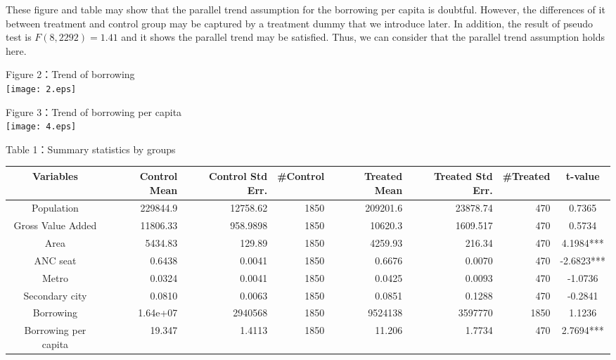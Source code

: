 \documentclass[dvipdfmx]{jsarticle}
\begin{document}
\quad These figure and table may show that the parallel trend assumption for the borrowing per capita is doubtful. However, the differences of it between treatment and control group may be captured by a treatment dummy that we introduce later. In addition, the result of pseudo test is $F(8,2292) =1.41$ and it shows the parallel trend may be satisfied. Thus, we can consider that the parallel trend assumption holds here. 
\begin{center}Figure 2：Trend of borrowing\\
\texttt{[image: 2.eps]}
\end{center}
\begin{center}Figure 3：Trend of borrowing per capita\\
\texttt{[image: 4.eps]}
\end{center}
\begin{center}Table 1：Summary statistics by groups\\
\scriptsize\begin{tabular}{c|rrrrrr|c} \hline
Variables &Control Mean&Control Std Err.  & \#Control &Treated Mean &Treated Std Err. &\#Treated &t-value \\ \hline
Population & 229844.9 &12758.62&  1850 & 209201.6  &23878.74 & 470 &0.7365\\ 
Gross Value Added  &11806.33&958.9898 &1850&10620.3  & 1609.517 &470 &  0.5734\\
Area&5434.83&129.89&1850&4259.93&216.34&470 &4.1984***\\
ANC seat &0.6438&0.0041 &1850 & 0.6676&0.0070 &470 &-2.6823***\\ 
Metro&0.0324&0.0041&1850  &0.0425 &0.0093&470 &-1.0736\\
Secondary city&0.0810&0.0063&1850&0.0851&0.1288&470  &-0.2841\\
Borrowing&1.64e+07 &2940568  &1850 &9524138 &3597770&1850 &1.1236\\
Borrowing per capita&19.347& 1.4113&1850&11.206 &1.7734&470  &2.7694***\\ \hline
\end{tabular}\normalsize
\end{center}
\end{document}
